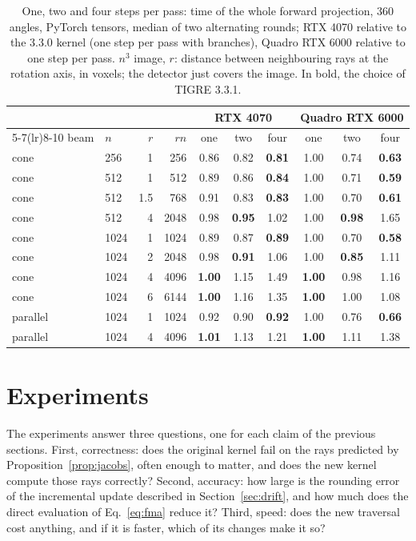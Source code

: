 \documentclass[11pt,a4paper]{article}
\theoremstyle{remark}
\begin{document}
\begin{table}[h]
\centering
\caption{\label{tab:steps}One, two and four steps per pass: time of the whole forward projection, 360 angles,
PyTorch tensors, median of two alternating rounds; RTX 4070 relative to the 3.3.0 kernel (one step per pass with
branches), Quadro RTX 6000 relative to one step per pass. $n^3$ image, $r$: distance between neighbouring rays at
the rotation axis, in voxels; the detector just covers the image. In bold, the choice of TIGRE 3.3.1.}
\small\setlength{\tabcolsep}{4pt}
\begin{tabular}{llrrcccccc}
\toprule
& & & & \multicolumn{3}{c}{RTX 4070} & \multicolumn{3}{c}{Quadro RTX 6000}\\
\cmidrule(lr){5-7}\cmidrule(lr){8-10}
beam & $n$ & $r$ & $rn$ & one & two & four & one & two & four\\
\midrule
cone     & 256 & 1 & 256 & 0.86 & 0.82 & \textbf{0.81} & 1.00 & 0.74 & \textbf{0.63}\\
cone     & 512 & 1 & 512 & 0.89 & 0.86 & \textbf{0.84} & 1.00 & 0.71 & \textbf{0.59}\\
cone     & 512 & 1.5 & 768 & 0.91 & 0.83 & \textbf{0.83} & 1.00 & 0.70 & \textbf{0.61}\\
cone     & 512 & 4 & 2048 & 0.98 & \textbf{0.95} & 1.02 & 1.00 & \textbf{0.98} & 1.65\\
cone     & 1024 & 1 & 1024 & 0.89 & 0.87 & \textbf{0.89} & 1.00 & 0.70 & \textbf{0.58}\\
cone     & 1024 & 2 & 2048 & 0.98 & \textbf{0.91} & 1.06 & 1.00 & \textbf{0.85} & 1.11\\
cone     & 1024 & 4 & 4096 & \textbf{1.00} & 1.15 & 1.49 & \textbf{1.00} & 0.98 & 1.16\\
cone     & 1024 & 6 & 6144 & \textbf{1.00} & 1.16 & 1.35 & \textbf{1.00} & 1.00 & 1.08\\
parallel & 1024 & 1 & 1024 & 0.92 & 0.90 & \textbf{0.92} & 1.00 & 0.76 & \textbf{0.66}\\
parallel & 1024 & 4 & 4096 & \textbf{1.01} & 1.13 & 1.21 & \textbf{1.00} & 1.11 & 1.38\\
\bottomrule
\end{tabular}
\end{table}

\section{Experiments}
\label{sec:results}

The experiments answer three questions, one for each claim of the previous sections. First, correctness:
does the original kernel fail on the rays predicted by Proposition~\ref{prop:jacobs}, often enough to
matter, and does the new kernel compute those rays correctly? Second, accuracy: how large is the rounding
error of the incremental update described in Section~\ref{sec:drift}, and how much does the direct
evaluation of Eq.~\eqref{eq:fma} reduce it? Third, speed: does the new traversal cost anything, and if it is
faster, which of its changes make it so?
\end{document}
